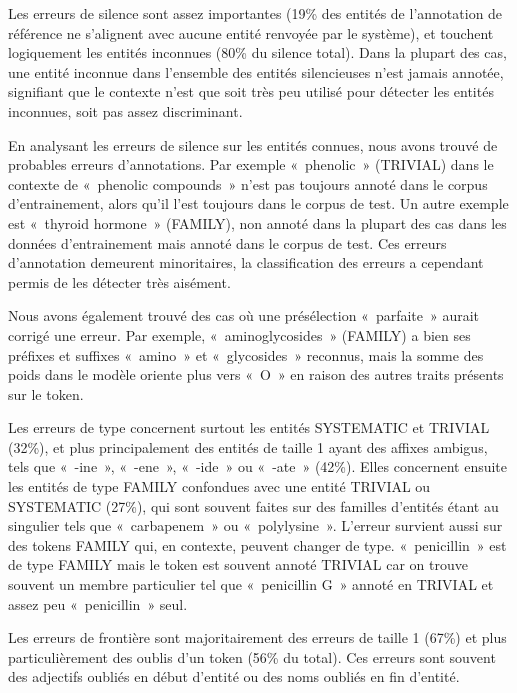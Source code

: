 \documentclass[PhD-Yoann-Dupont.tex]{subfiles}
\begin{document}
Les erreurs de silence sont assez importantes (19\% des entités de l'annotation de référence ne s'alignent avec aucune entité renvoyée par le système), et touchent logiquement les entités inconnues (80\% du silence total). Dans la plupart des cas, une entité inconnue dans l'ensemble des entités silencieuses n'est jamais annotée, signifiant que le contexte n'est que soit très peu utilisé pour détecter les entités inconnues, soit pas assez discriminant.

En analysant les erreurs de silence sur les entités connues, nous avons trouvé de probables erreurs d'annotations. Par exemple «\ phenolic\ » (TRIVIAL) dans le contexte de «\ phenolic compounds\ » n'est pas toujours annoté dans le corpus d'entrainement, alors qu'il l'est toujours dans le corpus de test. Un autre exemple est «\ thyroid hormone\ » (FAMILY), non annoté dans la plupart des cas dans les données  d'entrainement mais annoté dans le corpus de test. Ces erreurs d'annotation demeurent minoritaires, la classification des erreurs a cependant permis de les détecter très aisément.

Nous avons également trouvé des cas où une présélection «\ parfaite\ » aurait corrigé une erreur. Par exemple, «\ aminoglycosides\ » (FAMILY) a bien ses préfixes et suffixes «\ amino\ » et «\ glycosides\ » reconnus, mais la somme des poids dans le modèle oriente plus vers «\ O\ » en raison des autres traits présents sur le token.

Les erreurs de type concernent surtout les entités SYSTEMATIC et TRIVIAL (32\%), et plus principalement des entités de taille 1 ayant des affixes ambigus, tels que «\ -ine\ », «\ -ene\ », «\ -ide\ » ou «\ -ate\ » (42\%). Elles concernent ensuite les entités de type FAMILY confondues avec une entité TRIVIAL ou SYSTEMATIC (27\%), qui sont souvent faites sur des familles d'entités étant au singulier tels que «\ carbapenem\ » ou «\ polylysine\ ». L'erreur survient aussi sur des tokens FAMILY qui, en contexte, peuvent changer de type. «\ penicillin\ » est de type FAMILY mais le token est souvent annoté TRIVIAL car on trouve souvent un membre particulier tel que «\ penicillin G\ » annoté en TRIVIAL et assez peu «\ penicillin\ » seul.

Les erreurs de frontière sont majoritairement des erreurs de taille 1 (67\%) et plus particulièrement des oublis d'un token (56\% du total). Ces erreurs sont souvent des adjectifs oubliés en début d'entité ou des noms oubliés en fin d'entité.
\end{document}
